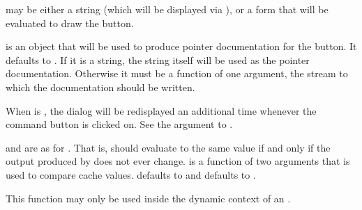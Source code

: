  may be either a string (which will be displayed via
), or a form that will be evaluated to draw the button.

 is an object that will be used to produce pointer
documentation for the button.  It defaults to .  If it is a string,
the string itself will be used as the pointer documentation.  Otherwise it must
be a function of one argument, the stream to which the documentation should be
written.

When  is , the dialog will be redisplayed an
additional time whenever the command button is clicked on.  See the
 argument to .
 
 and  are as for .  That
is,  should evaluate to the same value if and only if the
output produced by  does not ever change.   is a
function of two arguments that is used to compare cache values.
 defaults to  and  defaults to .

This function may only be used inside the dynamic context of an
.
